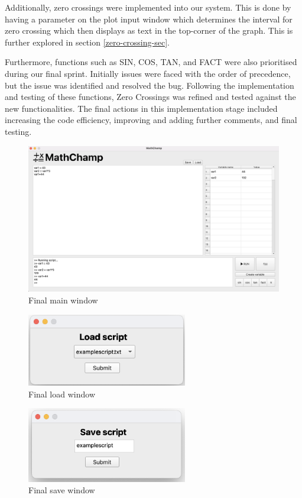 \documentclass[a4paper, oneside, 11pt]{report}
\begin{document}
Additionally, zero crossings were implemented into our system. This is done by having a parameter on the plot input window which determines the interval for zero crossing which then displays as text in the top-corner of the graph. This is further explored in section \ref{zero-crossing-sec}.

Furthermore, functions such as SIN, COS, TAN, and FACT were also prioritised during our final sprint. Initially issues were faced with the order of precedence, but the issue was identified and resolved the bug. Following the implementation and testing of these functions, Zero Crossings was refined and tested against the new functionalities. The final actions in this implementation stage included increasing the code efficiency, improving and adding further comments, and final testing.

\newpage

\begin{figure}[H]
    \centering
    \includegraphics[width=15cm]{final_main.jpg}
    \caption{Final main window}
    \label{fig:final_main}
\end{figure}

\begin{figure}[H]
    \centering
    \includegraphics[width=7cm]{final_load.jpg}
    \caption{Final load window}
    \label{fig:final_load}
\end{figure}

\begin{figure}[H]
    \centering
    \includegraphics[width=7cm]{final_save.jpg}
    \caption{Final save window}
    \label{fig:final_save}
\end{figure}
\end{document}
